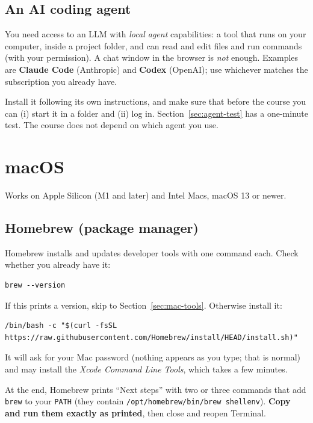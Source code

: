\documentclass[11pt,a4paper]{article}
\newcommand{\cmd}[1]{\texttt{#1}}
\begin{document}
\subsection{An AI coding agent}\label{sec:agent}
You need access to an LLM with \emph{local agent} capabilities: a tool that runs on
your computer, inside a project folder, and can read and edit files and run commands
(with your permission). A chat window in the browser is \emph{not} enough.
Examples are \textbf{Claude Code} (Anthropic) and \textbf{Codex} (OpenAI); use
whichever matches the subscription you already have.

Install it following its own instructions, and make sure that before the course you
can (i) start it in a folder and (ii) log in. Section~\ref{sec:agent-test} has a
one-minute test. The course does not depend on which agent you use.

\section{macOS}\label{sec:macos}

Works on Apple Silicon (M1 and later) and Intel Macs, macOS 13 or newer.

\subsection{Homebrew (package manager)}
Homebrew installs and updates developer tools with one command each. Check
whether you already have it:
\begin{lstlisting}
brew --version
\end{lstlisting}
If this prints a version, skip to Section~\ref{sec:mac-tools}. Otherwise install it:
\begin{lstlisting}
/bin/bash -c "$(curl -fsSL https://raw.githubusercontent.com/Homebrew/install/HEAD/install.sh)"
\end{lstlisting}
It will ask for your Mac password (nothing appears as you type; that is normal) and
may install the \emph{Xcode Command Line Tools}, which takes a few minutes.

\begin{warn}
At the end, Homebrew prints ``Next steps'' with two or three commands that add
\cmd{brew} to your \cmd{PATH} (they contain \cmd{/opt/homebrew/bin/brew shellenv}).
\textbf{Copy and run them exactly as printed}, then close and reopen Terminal.
\end{warn}
\end{document}
